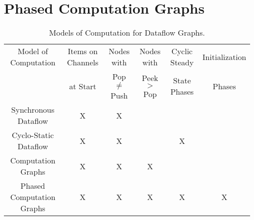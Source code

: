 \section{Phased Computation Graphs}
\label{sec:pcg}

\begin{table}[t]
\small
\begin{center}
\begin{tabular}{|c|c|c|c|c|c|} \hline
Model of Computation & Items on Channels & Nodes with & Nodes with & Cyclic Steady & Initialization \\
                     & at Start & Pop $\ne$ Push & Peek $>$ Pop & State Phases & Phases \\
\hline \hline
Synchronous Dataflow \cite{LM87-i} & X & X & & & \\
\hline
Cyclo-Static Dataflow \cite{BELP96} & X & X & & X & \\
\hline
Computation Graphs \cite{KM66} & X & X & X & & \\
\hline
Phased Computation Graphs & X & X & X & X & X \\
\hline
\end{tabular}
\vspace{-6pt}
\caption{\protect\small Models of Computation for Dataflow Graphs.}
\label{tab:models}
\vspace{-12pt}
\end{center}
\end{table}

